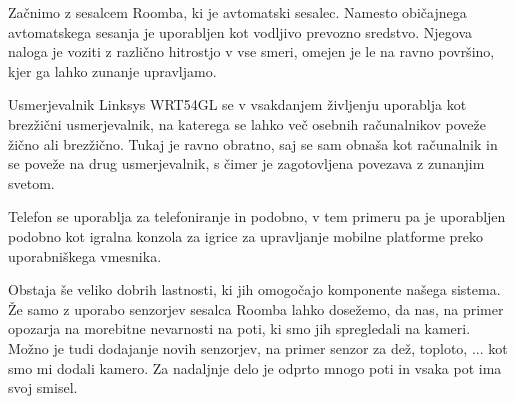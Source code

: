 \documentclass[a4paper, 12pt]{book}
\begin{document}
Začnimo z sesalcem Roomba, ki je avtomatski sesalec. Namesto običajnega avtomatskega sesanja je uporabljen kot vodljivo prevozno sredstvo. Njegova naloga je voziti z različno hitrostjo v vse smeri, omejen je le na ravno površino, kjer ga lahko zunanje upravljamo. 

Usmerjevalnik Linksys WRT54GL se v vsakdanjem življenju uporablja kot brezžični usmerjevalnik, na katerega se lahko več osebnih računalnikov poveže žično ali brezžično. Tukaj je ravno obratno, saj se sam obnaša kot računalnik in se poveže na drug usmerjevalnik, s čimer je zagotovljena povezava z zunanjim svetom.

Telefon se uporablja za telefoniranje in podobno, v tem primeru pa je uporabljen podobno kot igralna konzola za igrice za upravljanje mobilne platforme preko uporabniškega vmesnika. 

Obstaja še veliko dobrih lastnosti, ki jih omogočajo komponente našega sistema. Že samo z uporabo senzorjev sesalca Roomba lahko dosežemo, da nas, na primer opozarja na morebitne nevarnosti na poti, ki smo jih spregledali na kameri. Možno je tudi dodajanje novih senzorjev, na primer senzor za dež, toploto, ... kot smo mi dodali kamero. Za nadaljnje delo je odprto mnogo poti in vsaka pot ima svoj smisel. 
\end{document}
